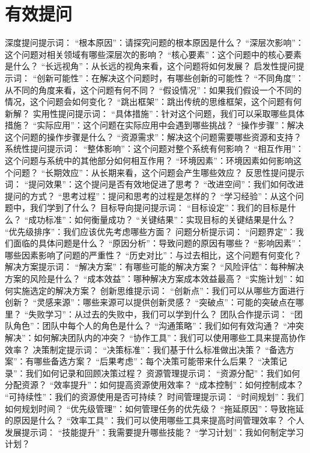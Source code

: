 \documentclass[12pt]{book}
\begin{document}
\section{有效提问}
深度提问提示词：
“根本原因”：请探究问题的根本原因是什么？
“深层次影响”：这个问题对相关领域有哪些深层次的影响？
“核心要素”：这个问题中的核心要素是什么？
“长远视角”：从长远的视角来看，这个问题将如何发展？
启发性提问提示词：
“创新可能性”：在解决这个问题时，有哪些创新的可能性？
“不同角度”：从不同的角度来看，这个问题有何不同？
“假设情况”：如果我们假设一个不同的情况，这个问题会如何变化？
“跳出框架”：跳出传统的思维框架，这个问题有何新解？
实用性提问提示词：
“具体措施”：针对这个问题，我们可以采取哪些具体措施？
“实际应用”：这个问题在实际应用中会遇到哪些挑战？
“操作步骤”：解决这个问题的操作步骤是什么？
“资源需求”：解决这个问题需要哪些资源和支持？
系统性提问提示词：
“整体影响”：这个问题对整个系统有何影响？
“相互作用”：这个问题与系统中的其他部分如何相互作用？
“环境因素”：环境因素如何影响这个问题？
“长期效应”：从长期来看，这个问题会产生哪些效应？
反思性提问提示词：
“提问效果”：这个提问是否有效地促进了思考？
“改进空间”：我们如何改进提问的方式？
“思考过程”：提问和思考的过程是怎样的？
“学习经验”：从这个问题中，我们学到了什么？
目标导向提问提示词：
“目标设定”：我们的目标是什么？
“成功标准”：如何衡量成功？
“关键结果”：实现目标的关键结果是什么？
“优先级排序”：我们应该优先考虑哪些方面？
问题分析提示词：
“问题界定”：我们面临的具体问题是什么？
“原因分析”：导致问题的原因有哪些？
“影响因素”：哪些因素影响了问题的严重性？
“历史对比”：与过去相比，这个问题有何变化？
解决方案提示词：
“解决方案”：有哪些可能的解决方案？
“风险评估”：每种解决方案的风险是什么？
“成本效益”：哪种解决方案成本效益最高？
“实施计划”：如何实施选定的解决方案？
创新思维提示词：
“创新点”：我们可以从哪些方面进行创新？
“灵感来源”：哪些来源可以提供创新灵感？
“突破点”：可能的突破点在哪里？
“失败学习”：从过去的失败中，我们可以学到什么？
团队合作提示词：
“团队角色”：团队中每个人的角色是什么？
“沟通策略”：我们如何有效沟通？
“冲突解决”：如何解决团队内的冲突？
“协作工具”：我们可以使用哪些工具来提高协作效率？
决策制定提示词：
“决策标准”：我们基于什么标准做出决策？
“备选方案”：有哪些备选方案？
“后果考虑”：每个决策可能带来什么后果？
“决策记录”：我们如何记录和回顾决策过程？
资源管理提示词：
“资源分配”：我们如何分配资源？
“效率提升”：如何提高资源使用效率？
“成本控制”：如何控制成本？
“可持续性”：我们的资源使用是否可持续？
时间管理提示词：
“时间规划”：我们如何规划时间？
“优先级管理”：如何管理任务的优先级？
“拖延原因”：导致拖延的原因是什么？
“效率工具”：我们可以使用哪些工具来提高时间管理效率？
个人发展提示词：
“技能提升”：我需要提升哪些技能？
“学习计划”：我如何制定学习计划？
\end{document}
